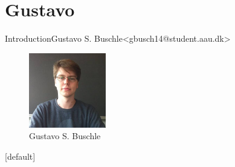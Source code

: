 \section{Gustavo}

\begin{frame}{Introduction}{Gustavo S. Buschle\newline<gbusch14@student.aau.dk>}
	\begin{figure}[h!]
		\includegraphics[width=0.3\textwidth]{images/gustavo.jpg}
		\caption{Gustavo S. Buschle}
		\centering    		
	\end{figure}
\end{frame}
[default]

%
%
%
